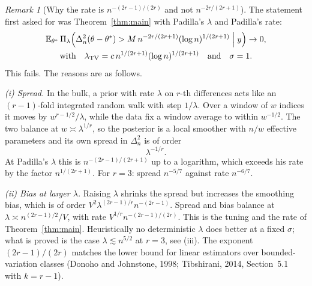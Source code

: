 \documentclass[11pt]{article}
\theoremstyle{definition}
\theoremstyle{remark}
\newtheorem{remark}{Remark}
\newcommand{\E}{\mathbb{E}}
\newcommand{\TV}{\mathrm{TV}}
\newcommand{\lamtv}{\lambda_{\TV}}
\newcommand{\thetas}{\theta^{*}}
\begin{document}
\begin{remark}[Why the rate is $n^{-(2r-1)/(2r)}$ and not $n^{-2r/(2r+1)}$]\label{rem:lower}
The statement first asked for was Theorem~\ref{thm:main} with Padilla's $\lambda$ and Padilla's rate:
\begin{equation}\label{eq:target}
\begin{gathered}
\E_{\thetas}\,\Pi_\lambda\Bigl(\Delta_n^2(\theta-\thetas)>M\,n^{-2r/(2r+1)}(\log n)^{1/(2r+1)}\Bigm| y\Bigr)\to 0,\\
\text{with}\quad \lamtv=c\,n^{1/(2r+1)}(\log n)^{1/(2r+1)}\quad\text{and}\quad\sigma=1 .
\end{gathered}
\end{equation}
This fails. The reasons are as follows.

\smallskip\noindent\emph{(i) Spread.} In the bulk, a prior with rate $\lambda$ on $r$-th differences acts like an $(r-1)$-fold integrated random walk with step $1/\lambda$. Over a window of $w$ indices it moves by $w^{r-1/2}/\lambda$, while the data fix a window average to within $w^{-1/2}$. The two balance at $w\asymp\lambda^{1/r}$, so the posterior is a local smoother with $n/w$ effective parameters and its own spread in $\Delta_n^2$ is of order
\[
\lambda^{-1/r}.
\]
At Padilla's $\lambda$ this is $n^{-(2r-1)/(2r+1)}$ up to a logarithm, which exceeds his rate by the factor $n^{1/(2r+1)}$. For $r=3$: spread $n^{-5/7}$ against rate $n^{-6/7}$.

\smallskip\noindent\emph{(ii) Bias at larger $\lambda$.} Raising $\lambda$ shrinks the spread but increases the smoothing bias, which is of order $V^{2}\lambda^{(2r-1)/r}n^{-(2r-1)}$. Spread and bias balance at $\lambda\asymp n^{(2r-1)/2}/V$, with rate $V^{1/r}n^{-(2r-1)/(2r)}$. This is the tuning and the rate of Theorem~\ref{thm:main}. Heuristically no deterministic $\lambda$ does better at a fixed $\sigma$; what is proved is the case $\lambda\lesssim n^{5/2}$ at $r=3$, see (iii). The exponent $(2r-1)/(2r)$ matches the lower bound for linear estimators over bounded-variation classes (Donoho and Johnstone, 1998; Tibshirani, 2014, Section~5.1 with $k=r-1$).


\end{remark}
\end{document}
